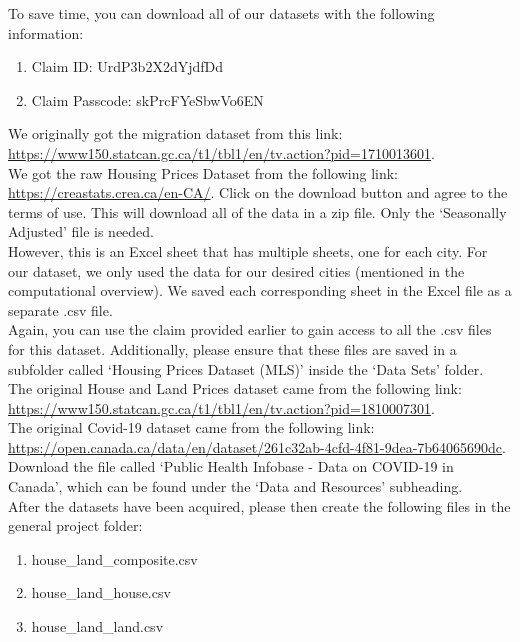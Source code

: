\documentclass[fontsize=11pt]{article}
\begin{document}
To save time, you can download all of our datasets with the following information:
\begin{enumerate}
    \item{Claim ID: UrdP3b2X2dYjdfDd}
    \item{Claim Passcode: skPrcFYeSbwVo6EN}
\end{enumerate}

We originally got the migration dataset from this link:\\ \href{https://www150.statcan.gc.ca/t1/tbl1/en/tv.action?pid=1710013601}{https://www150.statcan.gc.ca/t1/tbl1/en/tv.action?pid=1710013601}.\\

We got the raw Housing Prices Dataset from the following link: \href{https://creastats.crea.ca/en-CA/}{https://creastats.crea.ca/en-CA/}. Click on the download button and agree to the terms of use. This will download all of the data in a zip file. Only the ‘Seasonally Adjusted’ file is needed. \\

However, this is an Excel sheet that has multiple sheets, one for each city. For our dataset, we only used the data for our desired cities (mentioned in the computational overview). We saved each corresponding sheet in the Excel file as a separate .csv file. \\

Again, you can use the claim provided earlier to gain access to all the .csv files for this dataset. Additionally, please ensure that these files are saved in a subfolder called ‘Housing Prices Dataset (MLS)’ inside the ‘Data Sets’ folder. \\

The original House and Land Prices dataset came from the following link:\\ \href{https://www150.statcan.gc.ca/t1/tbl1/en/tv.action?pid=1810007301}{https://www150.statcan.gc.ca/t1/tbl1/en/tv.action?pid=1810007301}.\\

The original Covid-19 dataset came from the following link:\\ \href{https://open.canada.ca/data/en/dataset/261c32ab-4cfd-4f81-9dea-7b64065690dc}{https://open.canada.ca/data/en/dataset/261c32ab-4cfd-4f81-9dea-7b64065690dc}. Download the file called ‘Public Health Infobase - Data on COVID-19 in Canada’, which can be found under the ‘Data and Resources’ subheading.\\

After the datasets have been acquired, please then create the following files in the general project folder:
\begin{enumerate}
    \item{house\_land\_composite.csv}
    \item{house\_land\_house.csv}
    \item{house\_land\_land.csv}
\end{enumerate}
\end{document}
